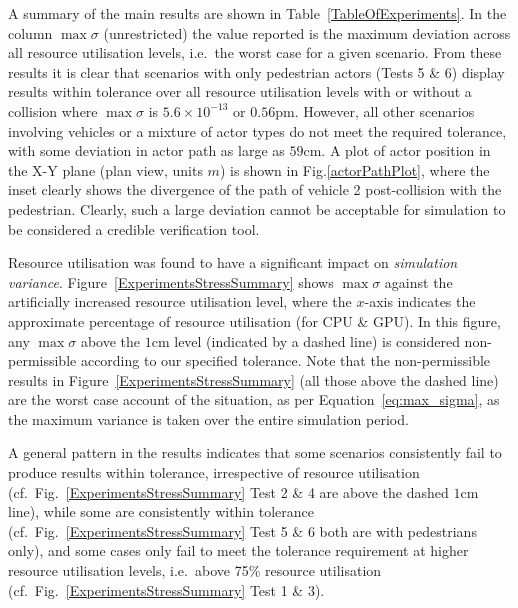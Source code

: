 A summary of the main results are shown in Table~\ref{TableOfExperiments}.  In the column $\max\sigma$ (unrestricted) the value reported is the maximum deviation across all resource utilisation levels, i.e.\ the worst case for a given scenario. From these results it is clear that scenarios with only pedestrian actors (Tests 5 \& 6) display results within tolerance over all resource utilisation levels with or without a collision where $\max\sigma$ is $5.6\times10^{-13}$ or $0.56\si{\pico\metre}$. However, all other scenarios involving vehicles or a mixture of actor types do not meet the required tolerance, with some deviation in actor path as large as $59$cm. 
%
A plot of actor position in the X-Y plane (plan view, units $m$) is shown in Fig.\ref{actorPathPlot}, where the inset clearly shows the divergence of the path of vehicle 2 post-collision with the pedestrian.
%
Clearly, such a large deviation cannot be acceptable for simulation to be considered a credible verification tool.

Resource utilisation was found to have a significant impact on \textit{simulation variance}. Figure~\ref{ExperimentsStressSummary} shows $\max\sigma$ against the artificially increased resource utilisation level, where the $x$-axis indicates the approximate percentage of resource utilisation (for CPU \& GPU). In this figure, any $\max\sigma$ above the $1$cm level (indicated by a dashed line) is considered non-permissible according to our specified tolerance. Note that the non-permissible results in Figure~\ref{ExperimentsStressSummary} (all those above the dashed line) are the worst case account of the situation, as per Equation~\ref{eq:max_sigma}, as the maximum variance is taken over the entire simulation period.

A general pattern in the results indicates that some scenarios consistently fail to produce results within tolerance, irrespective of resource utilisation (cf.\ Fig.~\ref{ExperimentsStressSummary} Test 2 \& 4 are above the dashed $1$cm line), while some are consistently within tolerance (cf.\ Fig.~\ref{ExperimentsStressSummary} Test 5 \& 6 both are with pedestrians only), and some cases only fail to meet the tolerance requirement at higher resource utilisation levels, i.e.\ above 75\% resource utilisation (cf.\ Fig.~\ref{ExperimentsStressSummary} Test 1 \& 3). 

